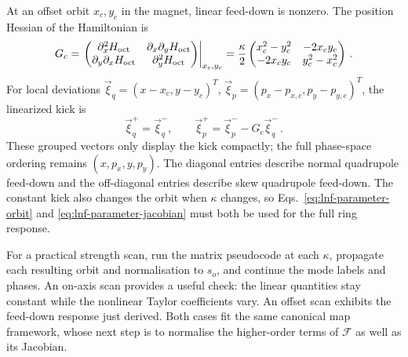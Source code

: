 At an offset orbit $x_c,y_c$ in the magnet, linear feed-down is
nonzero. The position Hessian of the Hamiltonian is
\begin{equation}\label{eq:lnf-octupole-feeddown}
    G_c = \left.\begin{pmatrix}
    \partial_x^2H_{\rm oct}&\partial_x\partial_yH_{\rm oct}\\
    \partial_y\partial_xH_{\rm oct}&\partial_y^2H_{\rm oct}
    \end{pmatrix}\right|_{x_c,y_c} = \frac{\kappa}{2}\begin{pmatrix}
    x_c^2-y_c^2&-2x_cy_c\\
    -2x_cy_c&y_c^2-x_c^2
    \end{pmatrix}\,.
\end{equation}
For local deviations $\vec\xi_q = (x-x_c,y-y_c)^T$,
$\vec\xi_p = (p_x-p_{x,c},p_y-p_{y,c})^T$, the linearized kick is
\begin{equation}
    \vec\xi_q^+= \vec\xi_q^-,\qquad
    \vec\xi_p^+= \vec\xi_p^- -G_c\vec\xi_q^-\,.
\end{equation}
These grouped vectors only display the kick compactly; the full
phase-space ordering remains $(x,p_x,y,p_y)$.
The diagonal entries describe normal quadrupole feed-down and the
off-diagonal entries describe skew quadrupole feed-down. The
constant kick also changes the orbit when $\kappa$ changes, so
Eqs.~\eqref{eq:lnf-parameter-orbit} and
\eqref{eq:lnf-parameter-jacobian} must both be used for the full
ring response.

For a practical strength scan, run the matrix pseudocode at each
$\kappa$, propagate each resulting orbit and normalisation to $s_o$,
and continue the mode labels and phases. An on-axis scan provides
a useful check: the linear quantities stay constant while the
nonlinear Taylor coefficients vary. An offset scan exhibits the
feed-down response just derived. Both cases fit the same canonical
map framework, whose next step is to normalise the higher-order
terms of $\mathcal F$ as well as its Jacobian.
